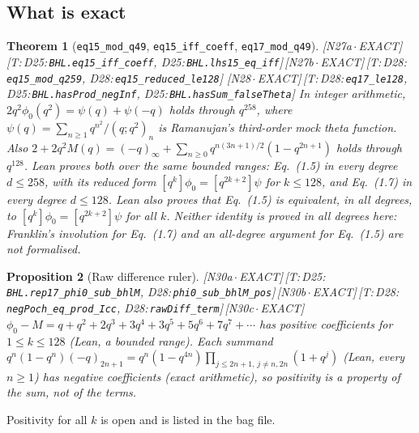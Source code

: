 \documentclass[11pt]{article}
\newtheorem{theorem}{Theorem}
\newtheorem{proposition}[theorem]{Proposition}
\theoremstyle{definition}
\newcommand{\lean}[1]{\texttt{\small #1}}
\newcommand{\dtag}[1]{#1}
\begin{document}
\subsection{What is exact}
\begin{theorem}[\lean{eq15\_mod\_q49}, \lean{eq15\_iff\_coeff}, \lean{eq17\_mod\_q49}]\dtag{\textsf{\small[N27a\,$\cdot$\,EXACT]}\,\textsf{\small[T:\,D25:\,\lean{BHL.\allowbreak{}eq15\_\allowbreak{}iff\_\allowbreak{}coeff}, D25:\,\lean{BHL.\allowbreak{}lhs15\_\allowbreak{}eq\_\allowbreak{}iff}]}\,\textsf{\small[N27b\,$\cdot$\,EXACT]}\,\textsf{\small[T:\,D28:\,\lean{eq15\_\allowbreak{}mod\_\allowbreak{}q259}, D28:\,\lean{eq15\_\allowbreak{}reduced\_\allowbreak{}le128}]} \textsf{\small[N28\,$\cdot$\,EXACT]}\,\textsf{\small[T:\,D28:\,\lean{eq17\_\allowbreak{}le128}, D25:\,\lean{BHL.\allowbreak{}hasProd\_\allowbreak{}negInf}, D25:\,\lean{BHL.\allowbreak{}hasSum\_\allowbreak{}falseTheta}]}}
In integer arithmetic, $2q^2\phi_0(q^2)=\psi(q)+\psi(-q)$ holds through $q^{258}$, where $\psi(q)=\sum_{n\ge1}q^{n^2}/(q;q^2)_n$ is Ramanujan's third-order mock theta function. Also $2+2q^2M(q)=(-q)_\infty+\sum_{n\ge0}q^{n(3n+1)/2}(1-q^{2n+1})$ holds through $q^{128}$. Lean proves both over the same bounded ranges: Eq.~(1.5) in every degree $d\le258$, with its reduced form $[q^k]\phi_0=[q^{2k+2}]\psi$ for $k\le128$, and Eq.~(1.7) in every degree $d\le128$. Lean also proves that Eq.~(1.5) is equivalent, in all degrees, to $[q^k]\phi_0=[q^{2k+2}]\psi$ for all $k$. Neither identity is proved in all degrees here: Franklin's involution for Eq.~(1.7) and an all-degree argument for Eq.~(1.5) are not formalised.
\end{theorem}
\begin{proposition}[Raw difference ruler]\dtag{\textsf{\small[N30a\,$\cdot$\,EXACT]}\,\textsf{\small[T:\,D25:\,\lean{BHL.\allowbreak{}rep17\_\allowbreak{}phi0\_\allowbreak{}sub\_\allowbreak{}bhlM}, D28:\,\lean{phi0\_\allowbreak{}sub\_\allowbreak{}bhlM\_\allowbreak{}pos}]}\,\textsf{\small[N30b\,$\cdot$\,EXACT]}\,\textsf{\small[T:\,D28:\,\lean{negPoch\_\allowbreak{}eq\_\allowbreak{}prod\_\allowbreak{}Icc}, D28:\,\lean{rawDiff\_\allowbreak{}term}]}\,\textsf{\small[N30c\,$\cdot$\,EXACT]}}
$\phi_0-M=q+q^2+2q^3+3q^4+3q^5+5q^6+7q^7+\cdots$ has positive coefficients for $1\le k\le128$ (Lean, a bounded range). Each summand $q^n(1-q^n)(-q)_{2n+1}=q^n(1-q^{4n})\prod_{j\le2n+1,\,j\ne n,2n}(1+q^j)$ (Lean, every $n\ge1$) has negative coefficients (exact arithmetic), so positivity is a property of the sum, not of the terms.
\end{proposition}
Positivity for all $k$ is open and is listed in the bag file.
\end{document}
